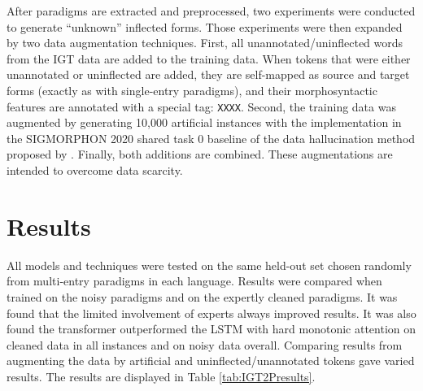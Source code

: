 After paradigms are extracted and preprocessed, two experiments were conducted to generate ``unknown'' inflected forms. Those experiments were then expanded by two data augmentation techniques. First, all unannotated/uninflected words from the IGT data are added to the training data. When tokens that were either unannotated or uninflected are added, they are self-mapped as source and target forms (exactly as with single-entry paradigms), and their morphosyntactic features are annotated with a special tag: \texttt{XXXX}.  Second, the training data was augmented by generating 10,000 artificial instances with the implementation in the SIGMORPHON 2020 shared task 0 baseline of the data hallucination method proposed by \citep{anastasopoulos-neubig-2019-pushing}. Finally, both additions are combined. These augmentations are intended to overcome data scarcity. 


\section{Results}
\label{sec:IGT2Presults}

All models and techniques were tested on the same held-out set chosen randomly from multi-entry paradigms in each language. Results were compared when trained on the noisy paradigms and on the expertly cleaned paradigms. It was found that the limited involvement of experts always improved results. It was also found the transformer outperformed the LSTM with hard monotonic attention on cleaned data in all instances and on noisy data overall. Comparing results from augmenting the data by artificial and uninflected/unannotated tokens gave varied results. 
The results are displayed in Table \ref{tab:IGT2Presults}. 

